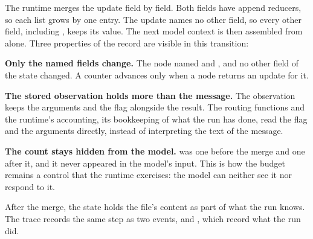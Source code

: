 The runtime merges the update field by field. Both fields have append reducers, so each list grows
by one entry. The update names no other field, so every other field, including
, keeps its value. The next model context is then assembled from
 alone. Three properties of the record are visible in this transition:
\bi
\item \textbf{Only the named fields change.} The node named  and
, and no other field of the state changed. A counter advances only when a node returns an update for it.
\item \textbf{The stored observation holds more than the message.} The observation keeps the
arguments and the  flag alongside the result. The routing functions and the runtime's
accounting, its bookkeeping of what the run has done, read the flag and the arguments directly,
instead of interpreting the text of the message.
\item \textbf{The count stays hidden from the model.}  was one before the
merge and one after it, and it never appeared in the model's input. This is how the budget remains
a control that the runtime exercises: the model can neither see it nor respond to it.
\ei

After the merge, the state holds the file's content as part of what the run knows. The trace
records the same step as two events,  and , which record
what the run did.

